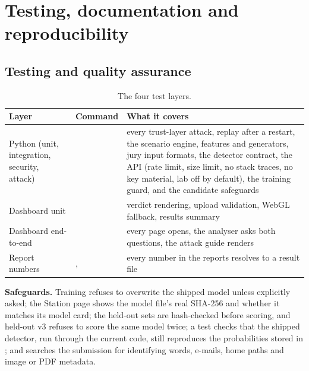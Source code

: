 \section{Testing, documentation and reproducibility}\label{sec:qa}

\subsection{Testing and quality assurance}
\begin{table}[!htbp]
\centering\small
\begin{tabularx}{\textwidth}{|L{3.6cm}|L{4.4cm}|Y|}
\hline
\textbf{Layer} & \textbf{Command} & \textbf{What it covers}\\
\hline
Python (unit, integration, security, attack) &  & every trust-layer attack, replay after a restart, the scenario engine, features and generators, jury input formats, the detector contract, the API (rate limit, size limit, no stack traces, no key material, lab off by default), the training guard, and the candidate safeguards\\
\hline
Dashboard unit &  & verdict rendering, upload validation, WebGL fallback, results summary\\
\hline
Dashboard end-to-end &  & every page opens, the analyser asks both questions, the attack guide renders\\
\hline
Report numbers & ,  & every number in the reports resolves to a result file\\
\hline
\end{tabularx}
\caption{The four test layers.}
\end{table}

\textbf{Safeguards.} Training refuses to overwrite the shipped model unless explicitly asked; the Station page shows the model file's real SHA-256 and whether it matches its model card; the held-out sets are hash-checked before scoring, and held-out v3 refuses to score the same model twice; a test checks that the shipped detector, run through the current code, still reproduces the probabilities stored in ; and  searches the submission for identifying words, e-mails, home paths and image or PDF metadata.

